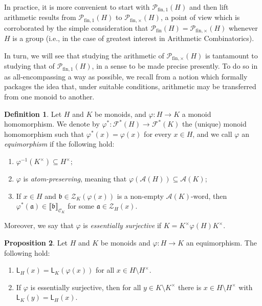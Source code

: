 \documentclass{report}
\renewcommand{\P}{\mathcal{P}}
\newcommand{\llb}{\llbracket}
\newcommand{\rrb}{\rrbracket}
\newcommand{\fin}{\textrm{fin}}
\newcommand{\funt}{{\textrm{fin}, \times}}
\newcommand{\fun}{{\textrm{fin}, 1}}
\renewcommand{\:}{\text{:}}
\theoremstyle{definition}
\newtheorem{defn}{Definition}[section]
\newtheorem{prop}[defn]{Proposition}
\begin{document}
In practice, it is more convenient to start with $\P_\fun(H)$ and then lift arithmetic results from $\P_\fun(H)$ to $\P_\funt(H)$, a point of view which is corroborated by the simple consideration that $\P_\fin(H) = \P_\funt(H)$ whenever $H$ is a group (i.e., in the case of greatest interest in Arithmetic Combinatorics).

In turn, we will see that studying the arithmetic of $\P_\funt(H)$ is tantamount to studying that of $\P_\fun(H)$, in a sense to be made precise presently.
To do so in as all-encompassing a way as possible, we recall from \cite[Definition 3.2]{tringali18} a notion which formally packages the idea that, under suitable conditions, arithmetic may be transferred from one monoid to another.
%
\begin{defn}\label{def:equimorphism}
	Let $H$ and $K$ be monoids, and $\varphi: H\to K$ a monoid homomorphism. We denote by $\varphi^*: \mathscr{F}^*(H)\to\mathscr{F}^*(K)$ the (unique) monoid homomorphism such that $\varphi^\ast(x) = \varphi(x)$ for every $x \in H$, and we call $\varphi$ an \textit{equimorphism} if the following hold:
	\begin{enumerate}[label={({\small{E}}\arabic{*})}]
		\item\label{def:equimorphism(E1)} $\varphi^{-1}(K^\times)\subseteq H^\times$;
		\item\label{def:equimorphism(E2)} $\varphi$ is \textit{atom-preserving}, meaning that $\varphi(\mathscr{A}(H)) \subseteq \mathscr{A}(K)$;
		\item\label{def:equimorphism(E3)} If $x\in H$ and $\mathfrak{b}\in \mathcal{Z}_K(\varphi(x))$ is a non-empty $\mathscr A(K)$-word, then $\varphi^*(\mathfrak{a}) \in \llb \mathfrak{b} \rrb_{\mathscr{C}_K}$ for some $\mathfrak{a}\in \mathcal{Z}_H(x)$.
	\end{enumerate}
	Moreover, we say that $\varphi$ is \textit{essentially surjective} if $K = K^\times \varphi(H)K^\times$.
\end{defn}
%
\begin{prop}\label{prop:equimorphism}
	Let $H$ and $K$ be monoids and $\varphi:H\to K$ an equimorphism. The following hold:
	\begin{enumerate}[label={\rm (\roman{*})}]
		\item\label{it:prop:equimorphism(i)} $\mathsf{L}_H(x) = \mathsf{L}_K(\varphi(x))$ for all $x\in H\setminus H^\times$.
		\item\label{it:prop:equimorphism(ii)} If $\varphi$ is essentially surjective, then for all $y\in K\setminus K^\times$ there is $x\in H\setminus H^\times$ with $\mathsf{L}_K(y) = \mathsf{L}_H(x)$.
	\end{enumerate}
\end{prop}
\end{document}
